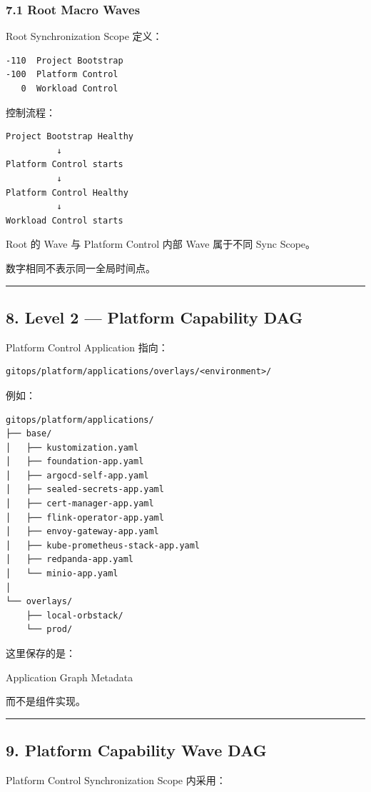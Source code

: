 \documentclass[11pt,a4paper]{article}
\begin{document}
\subsubsection{7.1 Root Macro Waves}
Root Synchronization Scope 定义：

\begin{lstlisting}[language=text]
-110  Project Bootstrap
-100  Platform Control
   0  Workload Control
\end{lstlisting}
控制流程：

\begin{lstlisting}[language=text]
Project Bootstrap Healthy
          ↓
Platform Control starts
          ↓
Platform Control Healthy
          ↓
Workload Control starts
\end{lstlisting}
Root 的 Wave 与 Platform Control 内部 Wave 属于不同 Sync Scope。

数字相同不表示同一全局时间点。

\vspace{0.5em}\hrule\vspace{0.5em}
\subsection{8. Level 2 — Platform Capability DAG}
Platform Control Application 指向：

\begin{lstlisting}[language=text]
gitops/platform/applications/overlays/<environment>/
\end{lstlisting}
例如：

\begin{lstlisting}[language=text]
gitops/platform/applications/
├── base/
│   ├── kustomization.yaml
│   ├── foundation-app.yaml
│   ├── argocd-self-app.yaml
│   ├── sealed-secrets-app.yaml
│   ├── cert-manager-app.yaml
│   ├── flink-operator-app.yaml
│   ├── envoy-gateway-app.yaml
│   ├── kube-prometheus-stack-app.yaml
│   ├── redpanda-app.yaml
│   └── minio-app.yaml
│
└── overlays/
    ├── local-orbstack/
    └── prod/
\end{lstlisting}
这里保存的是：

\begin{gfmBlockquote}
Application Graph Metadata
\end{gfmBlockquote}
而不是组件实现。

\vspace{0.5em}\hrule\vspace{0.5em}
\subsection{9. Platform Capability Wave DAG}
Platform Control Synchronization Scope 内采用：
\end{document}
